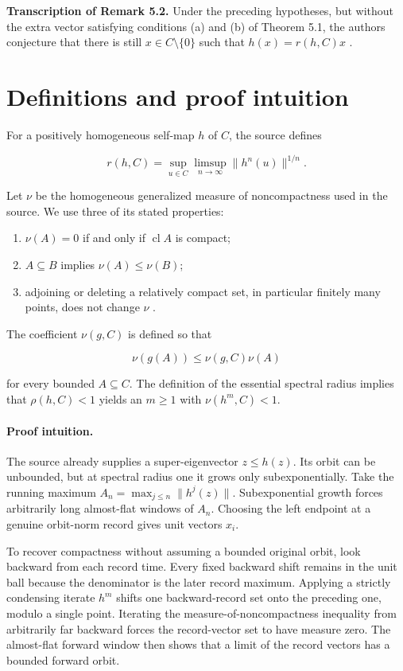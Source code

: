 \documentclass[11pt]{article}
\newcommand{\essrad}{\rho}
\newcommand{\cl}{\operatorname{cl}}
\begin{document}
\noindent\textbf{Transcription of Remark 5.2.}
Under the preceding hypotheses, but without the extra vector satisfying
conditions (a) and (b) of Theorem 5.1, the authors conjecture that there is
still \(x\in C\setminus\{0\}\) such that
\(h(x)=r(h,C)x\) \cite[Remark 5.2]{AGN}.

\section{Definitions and proof intuition}

For a positively homogeneous self-map \(h\) of \(C\), the source defines

\[
 r(h,C)=\sup_{u\in C}\limsup_{n\to\infty}\|h^n(u)\|^{1/n}.
\]

Let \(\nu\) be the homogeneous generalized measure of noncompactness used in
the source. We use three of its stated properties:

\begin{enumerate}
\item \(\nu(A)=0\) if and only if \(\cl A\) is compact;
\item \(A\subseteq B\) implies \(\nu(A)\le\nu(B)\);
\item adjoining or deleting a relatively compact set, in particular finitely
many points, does not change \(\nu\) \cite[Proposition 3.3]{AGN}.
\end{enumerate}

The coefficient \(\nu(g,C)\) is defined so that

\[
  \nu(g(A))\le \nu(g,C)\nu(A)
\]

for every bounded \(A\subseteq C\). The definition of the essential spectral
radius implies that \(\essrad(h,C)<1\) yields an \(m\ge1\) with
\(\nu(h^m,C)<1\).

\paragraph{Proof intuition.}
The source already supplies a super-eigenvector \(z\le h(z)\). Its orbit can
be unbounded, but at spectral radius one it grows only subexponentially. Take
the running maximum \(A_n=\max_{j\le n}\|h^j(z)\|\). Subexponential growth
forces arbitrarily long almost-flat windows of \(A_n\). Choosing the left
endpoint at a genuine orbit-norm record gives unit vectors \(x_i\).

To recover compactness without assuming a bounded original orbit, look
backward from each record time. Every fixed backward shift remains in the
unit ball because the denominator is the later record maximum. Applying a
strictly condensing iterate \(h^m\) shifts one backward-record set onto the
preceding one, modulo a single point. Iterating the measure-of-noncompactness
inequality from arbitrarily far backward forces the record-vector set to
have measure zero. The almost-flat forward window then shows that a limit of
the record vectors has a bounded forward orbit.
\end{document}
